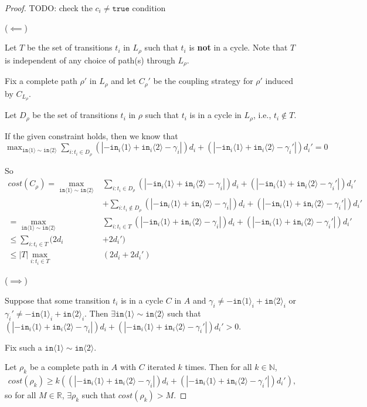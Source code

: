 \documentclass[12pt]{article}
\newcommand{\NN}{\mathbb{N}}
\newcommand{\RR}{\mathbb{R}}
\newcommand{\brangle}[1]{\langle #1 \rangle}
\theoremstyle{definition}
\begin{document}
\begin{proof}
    {\color{red} TODO: check the $c_i\neq \texttt{true}$ condition}

    ($\impliedby$)

    Let $T$ be the set of transitions $t_i$ in $L_\rho$ such that $t_i$ is \textbf{not} in a cycle. Note that $T$ is independent of any choice of path(s) through $L_\rho$. 

    Fix a complete path $\rho'$ in $L_\rho$ and let $C_\rho'$ be the coupling strategy for $\rho'$ induced by $C_{L_\rho}$. 

    Let $D_\rho$ be the set of transitions $t_i$ in $\rho$ such that $t_i$ is in a cycle in $L_\rho$, i.e., $t_i\notin T$.  

    If the given constraint holds, then we know that $\max_{\texttt{in}\brangle{1}\sim\texttt{in}\brangle{2}}\sum_{i: t_i\in D_\rho}(|-\texttt{in}_i\brangle{1}+\texttt{in}_i\brangle{2}-\gamma_i|)d_i+(|-\texttt{in}_i\brangle{1}+\texttt{in}_i\brangle{2}-\gamma_i'|)d_i' = 0$

    So \begin{align*}
        cost(C_\rho) = \max_{\texttt{in}\brangle{1}\sim\texttt{in}\brangle{2}}&\sum_{i: t_i\in D_\rho}(|-\texttt{in}_i\brangle{1}+\texttt{in}_i\brangle{2}-\gamma_i|)d_i+(|-\texttt{in}_i\brangle{1}+\texttt{in}_i\brangle{2}-\gamma_i'|)d_i'\\
        &+\sum_{i: t_i\notin D_\rho}(|-\texttt{in}_i\brangle{1}+\texttt{in}_i\brangle{2}-\gamma_i|)d_i+(|-\texttt{in}_i\brangle{1}+\texttt{in}_i\brangle{2}-\gamma_i'|)d_i'\\
        = \max_{\texttt{in}\brangle{1}\sim\texttt{in}\brangle{2}}&\sum_{i: t_i\in T}(|-\texttt{in}_i\brangle{1}+\texttt{in}_i\brangle{2}-\gamma_i|)d_i+(|-\texttt{in}_i\brangle{1}+\texttt{in}_i\brangle{2}-\gamma_i'|)d_i'\\
        \leq \sum_{i:t_i\in T}(2d_i& + 2d_i')\\
        \leq |T|\max_{i:t_i\in T}&(2d_i + 2d_i')
    \end{align*}

    ($\implies$)

    Suppose that some transition $t_i$ is in a cycle $C$ in $A$ and $\gamma_i\neq -\texttt{in}\brangle{1}_i+\texttt{in}\brangle{2}_i$ or $\gamma_i'\neq  -\texttt{in}\brangle{1}_i+\texttt{in}\brangle{2}_i$. Then $\exists \texttt{in}\brangle{1}\sim \texttt{in}\brangle{2}$ such that $(|-\texttt{in}_i\brangle{1}+\texttt{in}_i\brangle{2}-\gamma_i|)d_i+(|-\texttt{in}_i\brangle{1}+\texttt{in}_i\brangle{2}-\gamma_i'|)d_i'>0$.

    Fix such a $\texttt{in}\brangle{1}\sim \texttt{in}\brangle{2}$. 

    Let $\rho_k$ be a complete path in $A$ with $C$ iterated $k$ times. Then for all $k\in \NN$, \begin{align*}
        cost(\rho_k) \geq k((|-\texttt{in}_i\brangle{1}+\texttt{in}_i\brangle{2}-\gamma_i|)d_i+(|-\texttt{in}_i\brangle{1}+\texttt{in}_i\brangle{2}-\gamma_i'|)d_i'),
    \end{align*}
    so for all $M\in \RR$, $\exists \rho_k$ such that $cost(\rho_k) > M$.
\end{proof}
\end{document}
